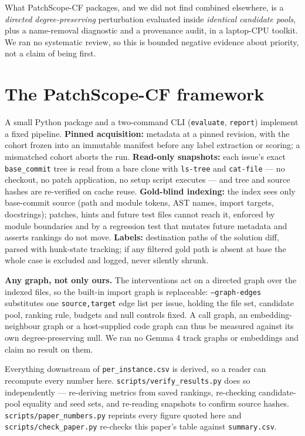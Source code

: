 \documentclass[10pt,a4paper]{article}
\begin{document}
What PatchScope-CF packages, and we did not find combined elsewhere, is a \textit{directed degree-preserving} perturbation evaluated inside \textit{identical candidate pools}, plus a name-removal diagnostic and a provenance audit, in a laptop-CPU toolkit. We ran no systematic review, so this is bounded negative evidence about priority, not a claim of being first.

\section{The PatchScope-CF framework}
A small Python package and a two-command CLI (\texttt{evaluate}, \texttt{report}) implement a fixed pipeline. \textbf{Pinned acquisition:} metadata at a pinned revision, with the cohort frozen into an immutable manifest before any label extraction or scoring; a mismatched cohort aborts the run. \textbf{Read-only snapshots:} each issue's exact \texttt{base\_commit} tree is read from a bare clone with \texttt{ls-tree} and \texttt{cat-file} --- no checkout, no patch application, no setup script executes --- and tree and source hashes are re-verified on cache reuse. \textbf{Gold-blind indexing:} the index sees only base-commit source (path and module tokens, AST names, import targets, docstrings); patches, hints and future test files cannot reach it, enforced by module boundaries and by a regression test that mutates future metadata and asserts rankings do not move. \textbf{Labels:} destination paths of the solution diff, parsed with hunk-state tracking; if any filtered gold path is absent at base the whole case is excluded and logged, never silently shrunk.

\textbf{Any graph, not only ours.} The interventions act on a directed graph over the indexed files, so the built-in import graph is replaceable: \texttt{--graph-edges} substitutes one \texttt{source,target} edge list per issue, holding the file set, candidate pool, ranking rule, budgets and null controls fixed. A call graph, an embedding-neighbour graph or a host-supplied code graph can thus be measured against its own degree-preserving null. We ran no Gemma 4 track graphs or embeddings and claim no result on them.

Everything downstream of \texttt{per\_instance.csv} is derived, so a reader can recompute every number here. \texttt{scripts/verify\_results.py} does so independently --- re-deriving metrics from saved rankings, re-checking candidate-pool equality and seed sets, and re-reading snapshots to confirm source hashes. \texttt{scripts/paper\_numbers.py} reprints every figure quoted here and \texttt{scripts/check\_paper.py} re-checks this paper's table against \texttt{summary.csv}.
\end{document}
